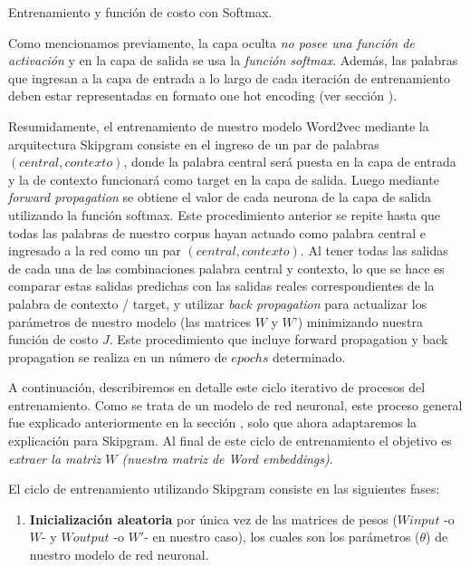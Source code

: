 \documentclass[12pt,a4paper]{article}
\makeatletter
\renewcommand\paragraph{\@startsection{paragraph}{4}{\z@}
            {-2.5ex\@plus -1ex \@minus -.25ex}
            {1.25ex \@plus .25ex}
            {\normalfont\normalsize\bfseries}}
\makeatother
\begin{document}
\begin{sloppypar}
\cleardoublepage

\paragraph{Entrenamiento y función de costo con Softmax.}\label{ent_costo_softmax}

Como mencionamos previamente, la capa oculta \textit{no posee una función de activación} y en la capa de salida se usa la \textit{función softmax}. Además, las palabras que ingresan a la capa de entrada a lo largo de cada iteración de entrenamiento deben estar representadas en formato one hot encoding (ver sección \textit{}).

Resumidamente, el entrenamiento de nuestro modelo Word2vec mediante la arquitectura Skipgram consiste en el ingreso de un par de palabras $(central, contexto)$, donde la palabra central será puesta en la capa de entrada y la de contexto funcionará como target en la capa de salida. Luego mediante \textit{forward propagation} se obtiene el valor de cada neurona de la capa de salida utilizando la función softmax. Este procedimiento anterior se repite hasta que todas las palabras de nuestro corpus hayan actuado como palabra central e ingresado a la red como un par $(central, contexto)$.
Al tener todas las salidas de cada una de las combinaciones palabra central y contexto, lo que se hace es comparar estas salidas predichas con las salidas reales correspondientes de la palabra de contexto / target, y utilizar \textit{back propagation} para actualizar los parámetros de nuestro modelo (las matrices $W$ y $W’$) minimizando nuestra función de costo $J$. Este procedimiento que incluye forward propagation y back propagation se realiza en un número de $epochs$ determinado. 

A continuación, describiremos en detalle este ciclo iterativo de procesos del entrenamiento. Como se trata de un modelo de red neuronal, este proceso general fue explicado anteriormente en la sección \textit{}, solo que ahora adaptaremos la explicación para Skipgram. Al final de este ciclo de entrenamiento el objetivo es \textit{extraer la matriz $W$ (nuestra matriz de Word embeddings)}.

El ciclo de entrenamiento utilizando Skipgram consiste en las siguientes fases:
\begin{enumerate}

\item \textbf{Inicialización aleatoria} por única vez de las matrices de pesos ($W input$ -o $W$- y $W output$ -o $W'$- en nuestro caso), los cuales son los parámetros ($\theta$) de nuestro modelo de red neuronal.  


\end{enumerate}
\end{sloppypar}
\end{document}
